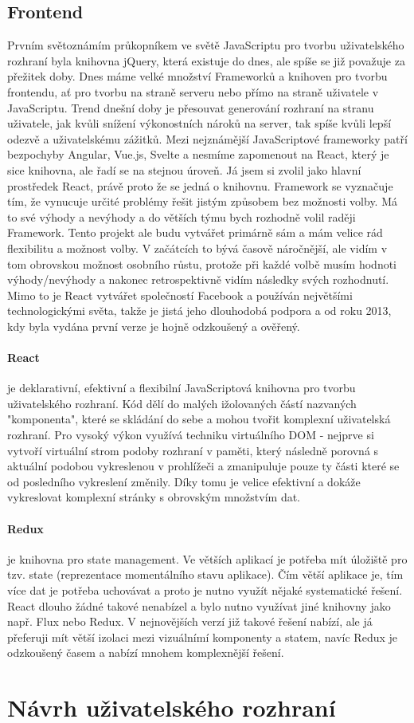 \subsection{Frontend}
Prvním světoznámím průkopníkem ve světě JavaScriptu pro tvorbu uživatelského rozhraní byla knihovna jQuery, která existuje do dnes, ale spíše se již považuje za přežitek doby. Dnes máme velké množství Frameworků a knihoven pro tvorbu frontendu, ať pro tvorbu na straně serveru nebo přímo na straně uživatele v JavaScriptu. Trend dnešní doby je přesouvat generování rozhraní na stranu uživatele, jak kvůli snížení výkonostních nároků na server, tak spíše kvůli lepší odezvě a uživatelskému zážitků. Mezi nejznámější JavaScriptové frameworky patří bezpochyby Angular, Vue.js, Svelte a nesmíme zapomenout na React, který je sice knihovna, ale řadí se na stejnou úroveň. Já jsem si zvolil jako hlavní prostředek React, právě proto že se jedná o knihovnu. Framework se vyznačuje tím, že vynucuje určité problémy řešit jistým způsobem bez možnosti volby. Má to své výhody a nevýhody a do větších týmu bych rozhodně volil raději Framework. Tento projekt ale budu vytvářet primárně sám a mám velice rád flexibilitu a možnost volby. V začátcích to bývá časově náročnější, ale vidím v tom obrovskou možnost osobního růstu, protože při každé volbě musím hodnoti výhody/nevýhody a nakonec retrospektivně vidím následky svých rozhodnutí. Mimo to je React vytvářet společností Facebook a používán největšími technologickými světa, takže je jistá jeho dlouhodobá podpora a od roku 2013, kdy byla vydána první verze je hojně odzkoušený a ověřený.

\paragraph{React} je deklarativní, efektivní a flexibilní JavaScriptová knihovna pro tvorbu uživatelského rozhraní. Kód dělí do malých ižolovaných částí nazvaných "komponenta", které se skládání do sebe a mohou tvořit komplexní uživatelská rozhraní. Pro vysoký výkon využívá techniku virtuálního DOM - nejprve si vytvoří virtuální strom podoby rozhraní v paměti, který následně porovná s aktuální podobou vykreslenou v prohlížeči a zmanipuluje pouze ty části které se od posledního vykreslení změnily. Díky tomu je velice efektivní a dokáže vykreslovat komplexní stránky s obrovským množstvím dat.

\paragraph{Redux} je knihovna pro state management. Ve větších aplikací je potřeba mít úložiště pro tzv. state (reprezentace momentálního stavu aplikace). Čím větší aplikace je, tím více dat je potřeba uchovávat a proto je nutno využít nějaké systematické řešení. React dlouho žádné takové nenabízel a bylo nutno využívat jiné knihovny jako např. Flux nebo Redux. V nejnovějších verzí již takové řešení nabízí, ale já přeferuji mít větší izolaci mezi vizuálnímí komponenty a statem, navíc Redux je odzkoušený časem a nabízí mnohem komplexnější řešení.

\section{Návrh uživatelského rozhraní}